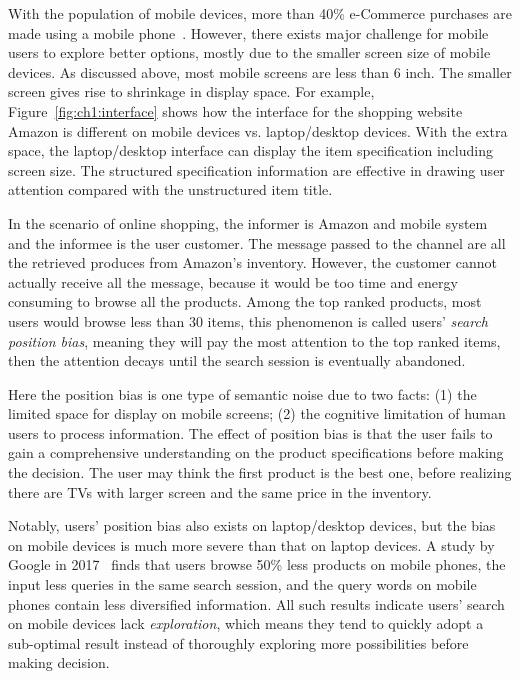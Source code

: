 With the population of mobile devices, more than 40\% e-Commerce purchases are made using a mobile phone~\cite{mobileecom}. However, there exists major challenge for mobile users to explore better options, mostly due to the smaller screen size of mobile devices. As discussed above, most mobile screens are less than 6 inch. The smaller screen gives rise to shrinkage in display space. For example, Figure~\ref{fig:ch1:interface} shows how the interface for the shopping website Amazon is different on mobile devices vs. laptop/desktop devices. With the extra space, the laptop/desktop interface can display the item specification including screen size. The structured specification information are effective in drawing user attention compared with the unstructured item title. 

In the scenario of online shopping, the informer is Amazon and mobile system and the informee is the user customer. The message passed to the channel are all the retrieved produces from Amazon's inventory. However, the customer cannot actually receive all the message, because it would be too time and energy consuming to browse all the products. Among the top ranked products, most users would browse less than 30 items, this phenomenon is called users' \textit{search position bias}, meaning they will pay the most attention to the top ranked items, then the attention decays until the search session is eventually abandoned.

Here the position bias is one type of semantic noise due to two facts: (1) the limited space for display on mobile screens; (2) the cognitive limitation of human users to process information. The effect of position bias is that the user fails to gain a comprehensive understanding on the product specifications before making the decision. The user may think the first product is the best one, before realizing there are TVs with larger screen and the same price in the inventory. 

Notably, users' position bias also exists on laptop/desktop devices, but the bias on mobile devices is much more severe than that on laptop devices. A study by Google in 2017~\cite{ong2017using} finds that users browse 50\% less products on mobile phones, the input less queries in the same search session, and the query words on mobile phones contain less diversified information. All such results indicate users' search on mobile devices lack \textit{exploration}, which means they tend to quickly adopt a sub-optimal result instead of thoroughly exploring more possibilities before making decision. 

